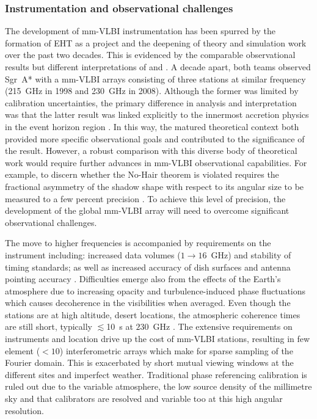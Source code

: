 \subsubsection{Instrumentation and observational challenges}\label{sec:eht_obs}

The development of mm-VLBI instrumentation has been spurred by the formation of EHT as a project and the deepening of theory and simulation work over the past two decades. This is evidenced by the comparable observational results but different interpretations of \citet{Krichbaum_1998} and \citet{Doeleman_2008}. A decade apart, both teams observed Sgr~A* with a mm-VLBI arrays consisting of three stations at similar frequency (215~GHz in 1998 and 230~GHz in 2008). Although the former was limited by calibration uncertainties, the primary difference in analysis and interpretation was that the latter result was linked explicitly to the innermost accretion physics in the event horizon region \citep[e.g.][]{Broderick_2011}. In this way, the matured theoretical context both provided more specific observational goals and contributed to the significance of the \citet{Doeleman_2008} result. However, a robust comparison with this diverse body of theoretical work would require further advances in mm-VLBI observational capabilities. For example, to discern whether the No-Hair theorem is violated requires the fractional asymmetry of the shadow shape with respect to its angular size to be measured to a few percent precision \citep[e.g.][and references therein]{Goddi_2016}. To achieve this level of precision, the development of the global mm-VLBI array will need to overcome significant observational challenges.

 
The move to higher frequencies is accompanied by requirements on the instrument including: increased data volumes ($1 \to 16$~GHz) and stability of timing standards; as well as increased accuracy of dish surfaces and antenna pointing accuracy \citep{Tilanus_2014}. Difficulties emerge also from the effects of the Earth's atmosphere due to increasing opacity and turbulence-induced phase fluctuations which causes decoherence in the visibilities when averaged. Even though the stations are at high altitude, desert locations, the atmospheric coherence times are still short, typically $\lesssim$10~s at $230$~GHz \citep{Doeleman_2009b}. The extensive requirements on instruments and location drive up the cost of mm-VLBI stations, resulting in few element ($<10$) interferometric arrays which make for sparse sampling of the Fourier domain. This is exacerbated by short mutual viewing windows at the different sites and imperfect weather. Traditional phase referencing calibration is ruled out due to the variable atmosphere, the low source density of the millimetre sky and that calibrators are resolved and variable too at this high angular resolution. 


